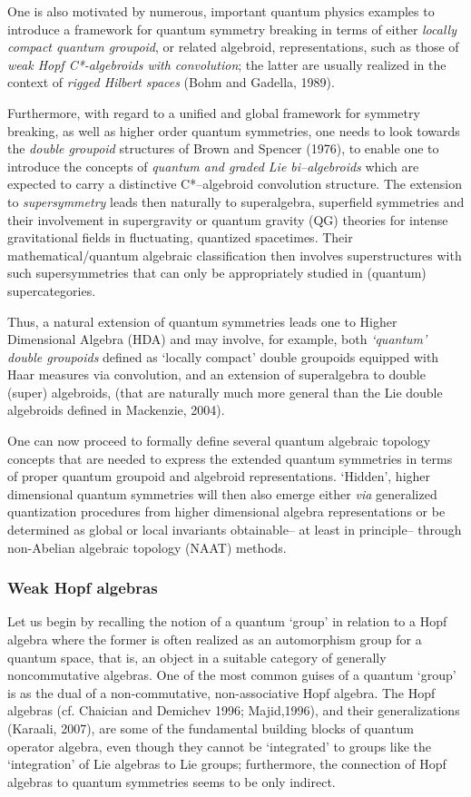 \documentclass[12pt]{article}
\theoremstyle{plain}
\theoremstyle{definition}
\numberwithin{equation}{section}
\newcommand{\<}{{\langle}}
\begin{document}
 One is also motivated by numerous, important quantum physics examples to introduce a framework for quantum symmetry breaking in terms of either \emph{locally compact quantum groupoid}, or related algebroid, representations, such as those of \emph{weak Hopf C*-algebroids with convolution}; the latter are usually realized in the context
of \emph{rigged Hilbert spaces} (Bohm and Gadella, 1989).

 Furthermore, with regard to a unified and global framework for symmetry breaking, 
as well as higher order quantum symmetries, one needs to look towards the \emph{double groupoid}
structures of Brown and Spencer (1976), to enable one to introduce the concepts
of \emph{quantum and graded Lie bi--algebroids} which are expected to carry a distinctive C*--algebroid convolution structure. The extension to \emph{supersymmetry} leads then naturally to superalgebra, superfield symmetries and their involvement in supergravity or quantum gravity (QG) theories for intense
gravitational fields in fluctuating, quantized spacetimes. Their mathematical/quantum algebraic 
classification then involves superstructures with such supersymmetries that can only be
appropriately studied in (quantum) supercategories. 

 Thus, a natural extension of quantum symmetries leads one to Higher Dimensional Algebra (HDA) 
and may involve, for example,  both \textit{`quantum' double groupoids} defined as `locally compact'
double groupoids equipped with Haar measures via convolution, and an extension of superalgebra 
to double (super) algebroids, (that are naturally much more general than the Lie double algebroids defined in Mackenzie,
2004).

One can now proceed to formally define several quantum algebraic topology concepts that are 
needed to express the extended quantum symmetries in terms of proper quantum groupoid and algebroid
representations. `Hidden', higher dimensional quantum symmetries will then also emerge either 
\emph{via} generalized quantization procedures from higher dimensional algebra representations or be
determined as global or local invariants obtainable-- at least in principle-- through 
non-Abelian algebraic topology (NAAT) methods.

\subsubsection{Weak Hopf algebras}

 Let us begin by recalling the notion of a quantum `group' in relation to a Hopf algebra where the former is often realized as an automorphism group for a quantum space, that is, an object in a suitable category of generally noncommutative algebras. One of the most common guises of a quantum `group' is as the dual of a 
non-commutative, non-associative Hopf algebra. The Hopf algebras (cf. Chaician and Demichev 1996; 
Majid,1996), and their generalizations (Karaali, 2007), are some of the fundamental building blocks
of quantum operator algebra, even though they cannot be `integrated' to groups like the `integration' of Lie algebras to Lie groups; furthermore, the connection of Hopf algebras to quantum symmetries seems to be only indirect.
\end{document}
